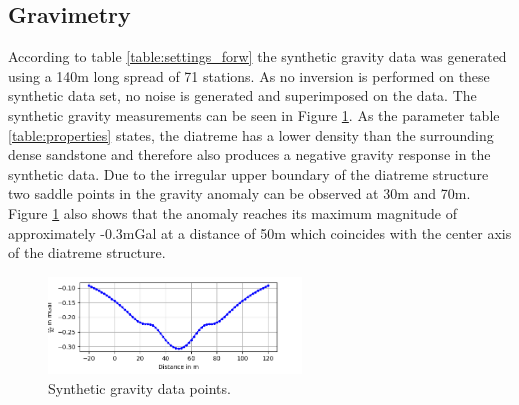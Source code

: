 \subsection{Gravimetry}
According to table \ref{table:settings_forw} the synthetic gravity data was generated using a 140m long spread of 71 stations. As no inversion is performed on these synthetic data set, no noise is generated and superimposed on the data. The synthetic gravity measurements can be seen in Figure \ref{figure:grav}. As the parameter table \ref{table:properties} states, the diatreme has a lower density than the surrounding dense sandstone and therefore also produces a negative gravity response in the synthetic data. Due to the irregular upper boundary of the diatreme structure two saddle points in the gravity anomaly can be observed at 30m and 70m. Figure \ref{figure:grav} also shows that the anomaly reaches its maximum magnitude of approximately -0.3mGal at a distance of 50m which coincides with the center axis of the diatreme structure.

\begin{figure}[]
  \centering
    \includegraphics[width=0.6\textwidth]{Figures/GRVA_dataonly.png}
    \caption[Synthetic gravity data]{Synthetic gravity data points.}
    \label{figure:grav}
\end{figure}


